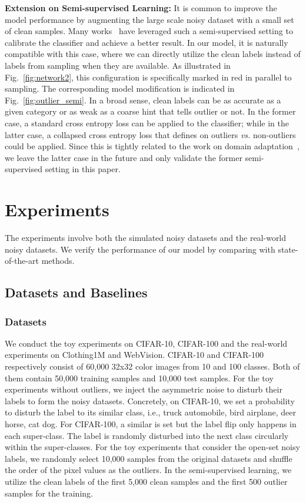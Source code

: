 \documentclass[journal]{IEEEtran}
\begin{document}
\textbf{Extension on Semi-supervised Learning:} It is common to improve the model performance by augmenting the large scale noisy dataset with a small set of clean samples. Many works~\cite{xiao2015learning,veit2017learning,patrini2017making,pmlr-v80-ren18a,Guo_2018_ECCV} have leveraged such a semi-supervised setting to calibrate the classifier and achieve a better result. In our model, it is naturally compatible with this case, where we can directly utilize the clean labels instead of labels from sampling when they are available. As illustrated in Fig.~\ref{fig:network2}, this configuration is specifically marked in red in parallel to sampling. The corresponding model modification is indicated in Fig.~\ref{fig:outlier_semi}. In a broad sense, clean labels can be as accurate as a given category or as weak as a coarse hint that tells outlier or not. In the former case, a standard cross entropy loss can be applied to the classifier; while in the latter case, a collapsed cross entropy loss that defines on outliers \textit{vs.} non-outliers could be applied. Since this is tightly related to the work on domain adaptation~\cite{Csurka2017DomainAF}, we leave the latter case in the future and only validate the former semi-supervised setting in this paper.

\section{Experiments}
The experiments involve both the simulated noisy datasets and the real-world noisy datasets. We verify the performance of our model by comparing with state-of-the-art methods.

\subsection{Datasets and Baselines}
\subsubsection{Datasets}
We conduct the toy experiments on CIFAR-10, CIFAR-100 and the real-world experiments on Clothing1M and WebVision.
CIFAR-10 and CIFAR-100~\cite{krizhevsky2009learning} respectively consist of 60,000 32x32 color images from 10 and 100 classes. Both of them contain 50,000 training samples and 10,000 test samples. For the toy experiments without outliers, we inject the asymmetric noise to disturb their labels to form the noisy datasets. Concretely, on CIFAR-10, we set a probability  to disturb the label to its similar class, i.e., truck  automobile, bird  airplane, deer  horse, cat  dog. For CIFAR-100, a similar  is set but the label flip only happens in each super-class. The label is randomly disturbed into the next class circularly within the super-classes. For the toy experiments that consider the open-set noisy labels, we randomly select 10,000 samples from the original datasets and shuffle the order of the pixel values as the outliers. In the semi-supervised learning, we utilize the clean labels of the first 5,000 clean samples and the first 500 outlier samples for the training.
\end{document}
